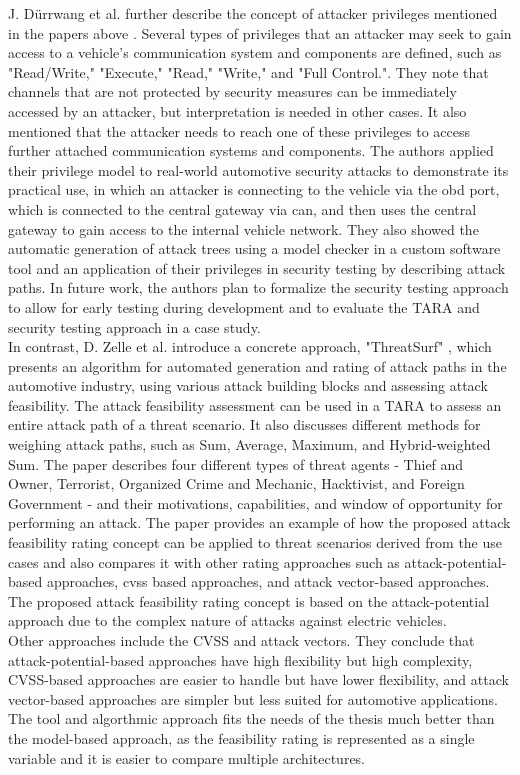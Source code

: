 J. Dürrwang et al. further describe the concept of attacker privileges mentioned in the papers above \cite{attacker_privileges}.
Several types of privileges that an attacker may seek to gain access to a vehicle's communication system and components are defined, such as "Read/Write," "Execute," "Read," "Write," and "Full Control.".
They note that channels that are not protected by security measures can be immediately accessed by an attacker, but interpretation is needed in other cases. 
It also mentioned that the attacker needs to reach one of these privileges to access further attached communication systems and components.
The authors applied their privilege model to real-world automotive security attacks to demonstrate its practical use, in which
an attacker is connecting to the vehicle via the \gls{obd} port, which is connected to the central gateway via \gls{can}, and then uses the central gateway to gain access to the internal vehicle network.
They also showed the automatic generation of attack trees using a model checker in a custom software tool and an application of their privileges in security testing by describing attack paths. 
In future work, the authors plan to formalize the security testing approach to allow for early testing during development and to evaluate the TARA and security testing approach in a case study.\\

In contrast, D. Zelle et al. introduce a concrete approach, "ThreatSurf" \cite{threat_surf}, which presents an algorithm for automated generation and rating of 
attack paths in the automotive industry, using various attack building blocks and assessing attack feasibility.
The attack feasibility assessment can be used in a TARA to assess an entire attack path of a threat scenario.
It also discusses different methods for weighing attack paths, such as Sum, Average, Maximum, and Hybrid-weighted Sum. 
The paper describes four different types of threat agents - Thief and Owner, Terrorist, Organized Crime and Mechanic, Hacktivist, and Foreign Government - 
and their motivations, capabilities, and window of opportunity for performing an attack. 
The paper provides an example of how the proposed attack feasibility rating concept can be applied to threat scenarios derived from the use cases and also 
compares it with other rating approaches such as attack-potential-based approaches, \gls{cvss} based approaches, and attack vector-based approaches.
The proposed attack feasibility rating concept is based on the attack-potential approach due to the complex nature of attacks against electric vehicles.\\
Other approaches include the CVSS and attack vectors.
They conclude that attack-potential-based approaches have high flexibility but high complexity, 
CVSS-based approaches are easier to handle but have lower flexibility, and attack vector-based approaches are simpler but less suited for automotive applications.\\
The tool and algorthmic approach fits the needs of the thesis much better than the model-based approach, as the feasibility rating is represented as a single variable and it is easier to compare multiple architectures.\\

